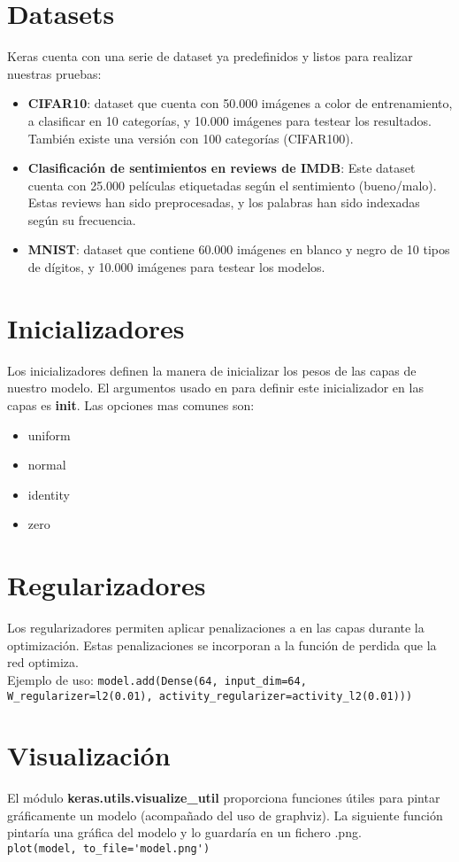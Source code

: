 \section{Datasets}
Keras cuenta con una serie de dataset ya predefinidos y listos para realizar nuestras pruebas:
\begin{itemize}
\item \textbf{CIFAR10}: dataset que cuenta con 50.000 imágenes a color de entrenamiento, a clasificar en 10 categorías, y 10.000 imágenes para testear los resultados. También existe una versión con 100 categorías (CIFAR100).
\item \textbf{Clasificación de sentimientos en reviews de IMDB}: Este dataset cuenta con 25.000 películas etiquetadas según el sentimiento (bueno/malo). Estas reviews han sido preprocesadas, y los palabras han sido indexadas según su frecuencia.
\item \textbf{MNIST}: dataset que contiene 60.000 imágenes en blanco y negro de 10 tipos de dígitos, y 10.000 imágenes para testear los modelos.
\end{itemize}
\section{Inicializadores}
Los inicializadores definen la manera de inicializar los pesos de las capas de nuestro modelo. El argumentos usado en para definir este inicializador en las capas es \textbf{init}. Las opciones mas comunes son:
\begin{itemize}[noitemsep]
\item uniform
\item normal
\item identity
\item zero
\end{itemize}
\section{Regularizadores}
Los regularizadores permiten aplicar penalizaciones a en las capas durante la optimización. Estas penalizaciones se incorporan a la función de perdida que la red optimiza.\\
Ejemplo de uso:
\lstinline{model.add(Dense(64, input_dim=64, W_regularizer=l2(0.01), activity_regularizer=activity_l2(0.01)))}
\section{Visualización}
El módulo \textbf{keras.utils.visualize\_util} proporciona funciones útiles para pintar gráficamente un modelo (acompañado del uso de graphviz). La siguiente función pintaría una gráfica del modelo y lo guardaría en un fichero .png.\\
\lstinline{plot(model, to_file='model.png')}
